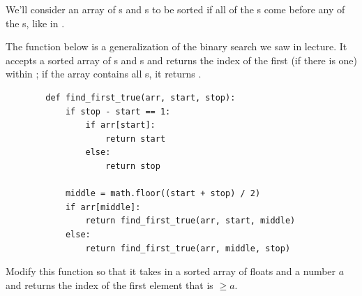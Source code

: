 \begin{prob}
    We'll consider an array of
    s and s to be sorted if all of the
    s come before any of the s, like in
    .

    The function  below is a generalization of the binary
    search we saw in lecture. It accepts a
    sorted array of s and s and returns the index of
    the first  (if there is one) within ;
    if the array contains all s, it returns .

    \begin{verbatim}
        def find_first_true(arr, start, stop):
            if stop - start == 1:
                if arr[start]:
                    return start
                else:
                    return stop

            middle = math.floor((start + stop) / 2)
            if arr[middle]:
                return find_first_true(arr, start, middle)
            else:
                return find_first_true(arr, middle, stop)
    \end{verbatim}

    Modify this function so that it takes in a sorted array of
    floats and a number $a$ and returns the index of the first element that is
    $\geq a$.

    \begin{soln}
        \inputminted{python}{\thisdir/include-solution/find_first_geq.py}
    \end{soln}

\end{prob}
